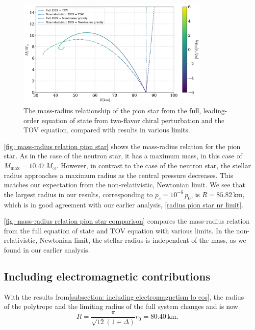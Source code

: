 \begin{figure}[!h]
    \centering
    \includegraphics[width=0.85\textwidth]{../scripts/figurer/pion_star/mass_radius_comparison.pdf}
    \caption{
        The mass-radius relationship of the pion star from the full, leading-order equation of state from two-flavor chiral perturbation and the TOV equation, compared with results in various limits.
        }
        \label{fig: mass-radius relation pion star comparison}
\end{figure}


\autoref{fig: mass-radius relation pion star} shows the mass-radius relation for the pion star.
As in the case of the neutron star, it has a maximum mass, in this case of $M_\text{max} = 10.47\, M_\odot$.
However, in contrast to the case of the neutron star, the stellar radius approaches a maximum radius as the central pressure decreases.
This matches our expectation from the non-relativistic, Newtonian limit.
We see that the largest radius in our results, corresponding to  $p_c = 10^{-6} \, p_0$, is $R = 85.82 \, \text{km}$, which is in good agreement with our earlier analysis, \autoref{radius pion star nr limit}.

\autoref{fig: mass-radius relation pion star comparison} compares the mass-radius relation from the full equation of state and TOV equation with various limits.
In the non-relativistic, Newtonian limit, the stellar radius is independent of the mass, as we found in our earlier analysis.




\FloatBarrier
\subsection{Including electromagnetic contributions}


With the results from\autoref{subsection: including electromagnetism lo eos}, the radius of the polytrope and the limiting radius of the full system changes and is now
%
\begin{equation}
    \label{maximum mass pion star with em interaction}
    R = \frac{\pi}{\sqrt{12}(1 + \Delta)} r_0 = 80.40 \, \text{km}.
\end{equation}


